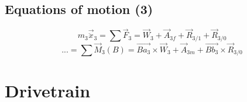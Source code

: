 \documentclass[10pt]{extarticle}
\begin{document}
\subsection{Equations of motion (3)}
\begin{equation}
    m_3\vec{\ddot{x}}_3 = \sum \vec{F}_3 = \vec{W}_3 + \vec{A}_{3f} + \vec{R}_{3/1} + \vec{R}_{3/0}
\end{equation}
\begin{equation}
    ... = \sum \vec{M}_3(B) =  \vec{Ba_3}\times \vec{W}_3 + \vec{A}_{3m} + \vec{Bb_3}\times \vec{R}_{3/0}
\end{equation}

\section{Drivetrain}
\end{document}
